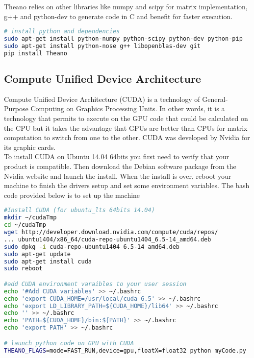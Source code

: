 		Theano relies on other libraries like numpy and scipy for matrix implementation, g++ and python-dev to generate code in C and benefit for faster execution. 

		\begin{lstlisting}[language=bash]
# install python and dependencies
sudo apt-get install python-numpy python-scipy python-dev python-pip 
sudo apt-get install python-nose g++ libopenblas-dev git
pip install Theano
		\end{lstlisting}



	\subsection{Compute Unified Device Architecture}
		Compute Unified Device Architecture (CUDA) is a technology of General-Purpose Computing on Graphics Processing Units. In other words, it is a technology that permits to execute on the GPU code that could be calculated on the CPU but it takes the advantage that GPUs are better than CPUs for matrix computation to switch from one to the other.
		CUDA was developed by Nvidia for its graphic cards.
		\\
		To install CUDA on Ubuntu 14.04 64bits you first need to verify that your product is compatible\cite{website:CUDA_compatibility}. Then download the Debian software package from the Nvidia website and launch the install.
		When the install is over, reboot your machine to finish the drivers setup and set some environment variables.
		The bash code provided below is to set up the machine
 

		\begin{lstlisting}[language=bash]
#Install CUDA (for ubuntu_lts 64bits 14.04)
mkdir ~/cudaTmp
cd ~/cudaTmp
wget http://developer.download.nvidia.com/compute/cuda/repos/
... ubuntu1404/x86_64/cuda-repo-ubuntu1404_6.5-14_amd64.deb
sudo dpkg -i cuda-repo-ubuntu1404_6.5-14_amd64.deb
sudo apt-get update
sudo apt-get install cuda
sudo reboot

#add CUDA environment varaibles to your user session
echo '#Add CUDA variables' >> ~/.bashrc
echo 'export CUDA_HOME=/usr/local/cuda-6.5' >> ~/.bashrc
echo 'export LD_LIBRARY_PATH=${CUDA_HOME}/lib64' >> ~/.bashrc
echo '' >> ~/.bashrc
echo 'PATH=${CUDA_HOME}/bin:${PATH}' >> ~/.bashrc
echo 'export PATH' >> ~/.bashrc

# launch python code on GPU with CUDA
THEANO_FLAGS=mode=FAST_RUN,device=gpu,floatX=float32 python myCode.py
		\end{lstlisting}



